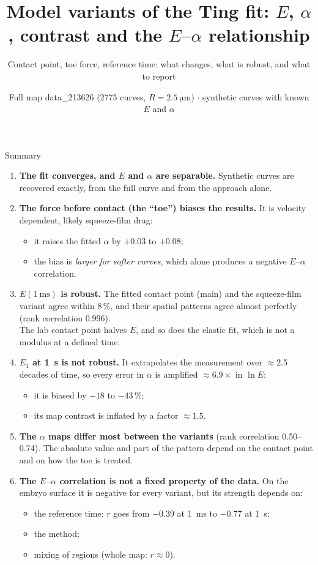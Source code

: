 \documentclass[aspectratio=169,9pt]{beamer}
\title{Model variants of the Ting fit: $E$, $\alpha$, contrast and the $E$--$\alpha$ relationship}
\subtitle{Contact point, toe force, reference time: what changes, what is robust, and what to report}
\date{Full map data\_213626 (2775 curves, $R=\SI{2.5}{\micro\metre}$) $\cdot$ synthetic curves with known $E$ and $\alpha$}
\author{}
\begin{document}
\maketitle

\begin{frame}{Summary}
\footnotesize
\begin{enumerate}
\item \textbf{The fit converges, and $E$ and $\alpha$ are separable.} Synthetic curves are recovered exactly, from the full curve and from the approach alone.
\item \textbf{The force before contact (the ``toe'') biases the results.} It is velocity dependent, likely squeeze-film drag:
 \begin{itemize}
 \item it raises the fitted $\alpha$ by +0.03 to +0.08;
 \item the bias is \emph{larger for softer curves}, which alone produces a negative $E$--$\alpha$ correlation.
 \end{itemize}
\item \textbf{$E(\SI{1}{\milli\second})$ is robust.} The fitted contact point (main) and the squeeze-film variant agree within 8\,\%, and their spatial patterns agree almost perfectly (rank correlation 0.996).\\
 The lab contact point halves $E$, and so does the elastic fit, which is not a modulus at a defined time.
\item \textbf{$E_1$ at \SI{1}{\second} is not robust.} It extrapolates the measurement over $\approx$2.5 decades of time, so every error in $\alpha$ is amplified $\approx6.9\times$ in $\ln E$:
 \begin{itemize}
 \item it is biased by $-18$ to $-43\,\%$;
 \item its map contrast is inflated by a factor $\approx1.5$.
 \end{itemize}
\item \textbf{The $\alpha$ maps differ most between the variants} (rank correlation 0.50--0.74). The absolute value and part of the pattern depend on the contact point and on how the toe is treated.
\item \textbf{The $E$--$\alpha$ correlation is not a fixed property of the data.} On the embryo surface it is negative for every variant, but its strength depends on:
 \begin{itemize}
 \item the reference time: $r$ goes from $-0.39$ at \SI{1}{\milli\second} to $-0.77$ at \SI{1}{\second};
 \item the method;
 \item mixing of regions (whole map: $r\approx0$).
 \end{itemize}
\end{enumerate}
\end{frame}
\end{document}
